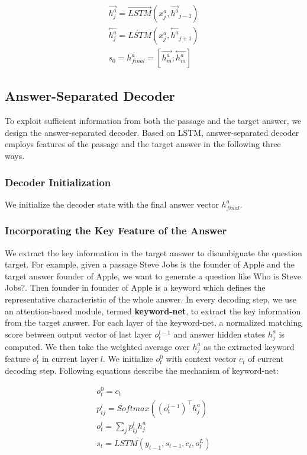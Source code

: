\documentclass[letterpaper]{article} %
\begin{document}
\begin{gather}
\overset{\rightarrow}{h^a_j} = \overrightarrow{LSTM}(x^a_j, \overset{\rightarrow}{h^a}_{j-1})  \label{eq_11} \\
\overset{\leftarrow}{h^a_j} = \overleftarrow{LSTM}(x^a_j, \overset{\leftarrow}{h^a}_{j+1})  \label{eq_12} \\
s_0 = h^a_{final} = [\overset{\rightarrow}{h^a_m};\overset{\leftarrow}{h^a_m}] \label{eq_13}
\end{gather}



\subsection{Answer-Separated Decoder}
To exploit sufficient information from both the passage and the target answer, we design the answer-separated decoder. Based on LSTM, answer-separated decoder employs features of the passage and the target answer in the following three ways.

\subsubsection{Decoder Initialization}
We initialize the decoder state with the final answer vector \(h^a_{final}\).

\subsubsection{Incorporating the Key Feature of the Answer}
We extract the key information in the target answer to disambiguate the question target. For example, given a passage Steve Jobs is the founder of Apple and the target answer founder of Apple, we want to generate a question like Who is Steve Jobs?. Then founder in founder of Apple is a keyword which defines the representative characteristic of the whole answer. In every decoding step, we use an attention-based module, termed \textbf{keyword-net}, to extract the key information from the target answer. For each layer of the keyword-net, a normalized matching score between output vector of last layer  \(o_t^{l-1}\) and answer hidden states \(h^a_j\) is computed. We then take the weighted average over \(h^a_j\) as the extracted keyword feature \(o^l_t\) in current layer \(l\). We initialize \(o^0_t\) with context vector \(c_t\) of current decoding step. Following equations describe the mechanism of keyword-net:

\begin{gather}
o^0_t = c_t \label{eq_14} \\
p^l_{tj} = Softmax((o^{l-1}_t)^{\top}h^a_{j}) \label{eq_15} \\
o_t^l = \sum_{j}p^l_{tj}h^a_{j}  \label{eq_16} \\
s_t = LSTM(y_{t-1}, s_{t-1}, c_t, o_t^L) \label{eq_17}
\end{gather}
\end{document}
